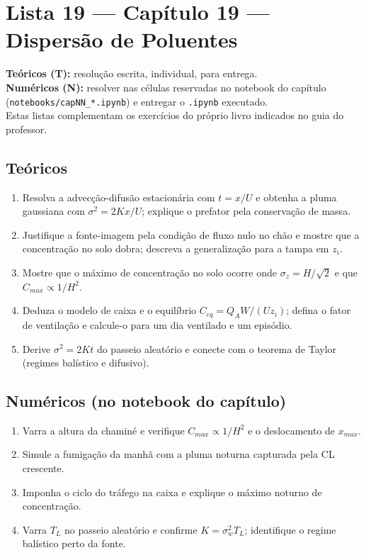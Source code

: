 \documentclass[11pt]{article}
\newcommand{\instrucoes}{%
\begin{caixalista}
\textbf{Teóricos (T):} resolução escrita, individual, para entrega.\\
\textbf{Numéricos (N):} resolver nas células reservadas no notebook do
capítulo (\texttt{notebooks/capNN\_*.ipynb}) e entregar o
\texttt{.ipynb} executado.\\
Estas listas complementam os exercícios do próprio livro indicados no
guia do professor.
\end{caixalista}}
\begin{document}
\clearpage
\section*{Lista 19 --- Capítulo 19 --- Dispersão de Poluentes}
\instrucoes

\subsection*{Teóricos}

\begin{enumerate}[label=\textbf{T\arabic*.},itemsep=4pt]
  \item Resolva a advecção-difusão estacionária com $t = x/U$ e
        obtenha a pluma gaussiana com
        $\sigma^2 = 2Kx/U$; explique o prefator pela conservação de
        massa.
  \item Justifique a fonte-imagem pela condição de fluxo nulo no chão
        e mostre que a concentração no solo dobra; descreva a
        generalização para a tampa em $z_i$.
  \item Mostre que o máximo de concentração no solo ocorre onde
        $\sigma_z = H/\sqrt2$ e que $C_{max} \propto 1/H^2$.
  \item Deduza o modelo de caixa e o equilíbrio
        $C_{eq} = Q_AW/(Uz_i)$; defina o fator de ventilação e
        calcule-o para um dia ventilado e um episódio.
  \item Derive $\sigma^2 = 2Kt$ do passeio aleatório e conecte com o
        teorema de Taylor (regimes balístico e difusivo).
\end{enumerate}

\subsection*{Numéricos (no notebook do capítulo)}

\begin{enumerate}[label=\textbf{N\arabic*.},itemsep=4pt]
  \item Varra a altura da chaminé e verifique
        $C_{max}\propto 1/H^2$ e o deslocamento de $x_{max}$.
  \item Simule a fumigação da manhã com a pluma noturna capturada
        pela CL crescente.
  \item Imponha o ciclo do tráfego na caixa e explique o máximo
        noturno de concentração.
  \item Varra $T_L$ no passeio aleatório e confirme
        $K = \sigma_w^2T_L$; identifique o regime balístico perto da
        fonte.
\end{enumerate}
\end{document}
